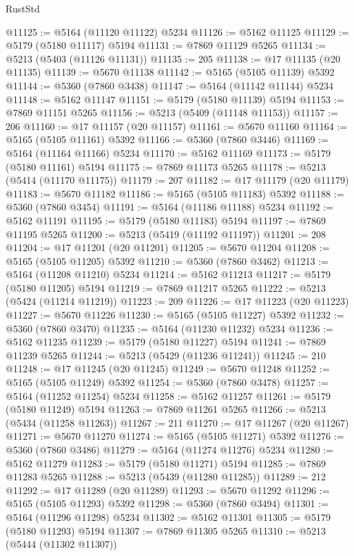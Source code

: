 \begin{lexlean}{RustStd}
\begin{coremodule}
@11125 := @5164 (@11120 @11122) @5234
@11126 := @5162 @11125
@11129 := @5179 (@5180 @11117) @5194
@11131 := @7869 @11129 @5265
@11134 := @5213 (@5403 (@11126 @11131))
@11135 := 205
@11138 := @17 @11135 (@20 @11135)
@11139 := @5670 @11138
@11142 := @5165 (@5105 @11139) @5392
@11144 := @5360 (@7860 @3438)
@11147 := @5164 (@11142 @11144) @5234
@11148 := @5162 @11147
@11151 := @5179 (@5180 @11139) @5194
@11153 := @7869 @11151 @5265
@11156 := @5213 (@5409 (@11148 @11153))
@11157 := 206
@11160 := @17 @11157 (@20 @11157)
@11161 := @5670 @11160
@11164 := @5165 (@5105 @11161) @5392
@11166 := @5360 (@7860 @3446)
@11169 := @5164 (@11164 @11166) @5234
@11170 := @5162 @11169
@11173 := @5179 (@5180 @11161) @5194
@11175 := @7869 @11173 @5265
@11178 := @5213 (@5414 (@11170 @11175))
@11179 := 207
@11182 := @17 @11179 (@20 @11179)
@11183 := @5670 @11182
@11186 := @5165 (@5105 @11183) @5392
@11188 := @5360 (@7860 @3454)
@11191 := @5164 (@11186 @11188) @5234
@11192 := @5162 @11191
@11195 := @5179 (@5180 @11183) @5194
@11197 := @7869 @11195 @5265
@11200 := @5213 (@5419 (@11192 @11197))
@11201 := 208
@11204 := @17 @11201 (@20 @11201)
@11205 := @5670 @11204
@11208 := @5165 (@5105 @11205) @5392
@11210 := @5360 (@7860 @3462)
@11213 := @5164 (@11208 @11210) @5234
@11214 := @5162 @11213
@11217 := @5179 (@5180 @11205) @5194
@11219 := @7869 @11217 @5265
@11222 := @5213 (@5424 (@11214 @11219))
@11223 := 209
@11226 := @17 @11223 (@20 @11223)
@11227 := @5670 @11226
@11230 := @5165 (@5105 @11227) @5392
@11232 := @5360 (@7860 @3470)
@11235 := @5164 (@11230 @11232) @5234
@11236 := @5162 @11235
@11239 := @5179 (@5180 @11227) @5194
@11241 := @7869 @11239 @5265
@11244 := @5213 (@5429 (@11236 @11241))
@11245 := 210
@11248 := @17 @11245 (@20 @11245)
@11249 := @5670 @11248
@11252 := @5165 (@5105 @11249) @5392
@11254 := @5360 (@7860 @3478)
@11257 := @5164 (@11252 @11254) @5234
@11258 := @5162 @11257
@11261 := @5179 (@5180 @11249) @5194
@11263 := @7869 @11261 @5265
@11266 := @5213 (@5434 (@11258 @11263))
@11267 := 211
@11270 := @17 @11267 (@20 @11267)
@11271 := @5670 @11270
@11274 := @5165 (@5105 @11271) @5392
@11276 := @5360 (@7860 @3486)
@11279 := @5164 (@11274 @11276) @5234
@11280 := @5162 @11279
@11283 := @5179 (@5180 @11271) @5194
@11285 := @7869 @11283 @5265
@11288 := @5213 (@5439 (@11280 @11285))
@11289 := 212
@11292 := @17 @11289 (@20 @11289)
@11293 := @5670 @11292
@11296 := @5165 (@5105 @11293) @5392
@11298 := @5360 (@7860 @3494)
@11301 := @5164 (@11296 @11298) @5234
@11302 := @5162 @11301
@11305 := @5179 (@5180 @11293) @5194
@11307 := @7869 @11305 @5265
@11310 := @5213 (@5444 (@11302 @11307))

\end{coremodule}
\end{lexlean}
